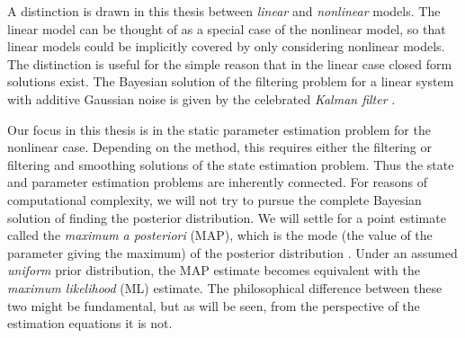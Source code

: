 A distinction is drawn in this thesis between \emph{linear} and \emph{nonlinear}
models. The linear model can be thought of as a special case of the nonlinear model,
so that linear models could be implicitly covered by only considering nonlinear models.
The distinction is useful for the simple reason that in the linear case closed
form solutions exist. The Bayesian solution of the filtering problem for a linear system
with additive Gaussian noise is given by the celebrated \emph{Kalman filter} \parencite{Kalman1960}.

Our focus in this thesis is in the static parameter estimation problem for the nonlinear case.
Depending on the method, this requires either the filtering or filtering and smoothing
solutions of the state estimation problem. Thus the state and parameter estimation problems
are inherently connected. For reasons of computational
complexity, we will not try to pursue the complete Bayesian solution of finding the 
posterior distribution. We will settle for a point estimate called the 
\emph{maximum a posteriori} (MAP), which is the mode (the value of the parameter giving the maximum) 
of the posterior distribution \parencite{gelman2004}.
Under an assumed \emph{uniform} prior distribution, the MAP estimate becomes equivalent 
with the \emph{maximum likelihood} (ML) estimate. The philosophical difference between these 
two might be fundamental, but as will be seen, from the perspective of the estimation equations it is not.

